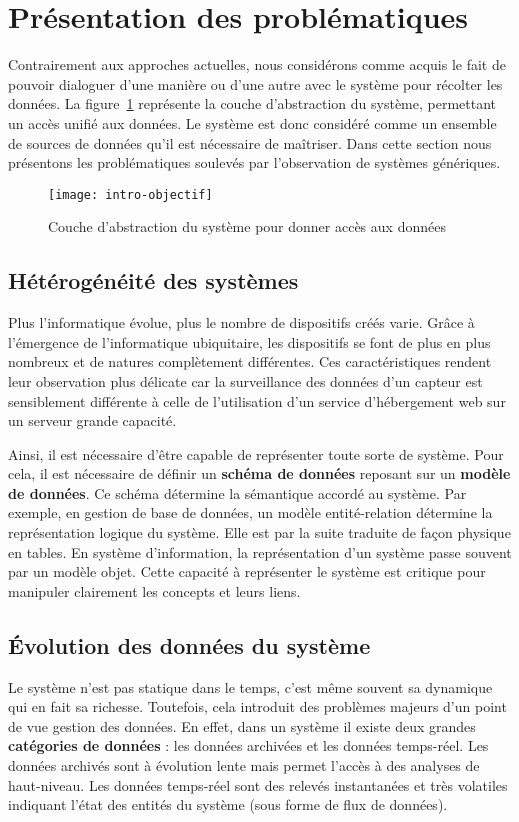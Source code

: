\section{Présentation des problématiques}\label{sec:intro:problematique}
Contrairement aux approches actuelles, nous considérons comme acquis le fait de pouvoir dialoguer d'une manière ou d'une autre avec le système pour récolter les données. La figure~\ref{fig:intro:objectif:abstraction} représente la couche d'abstraction du système, permettant un accès unifié aux données. Le système est donc considéré comme un ensemble de sources de données qu'il est nécessaire de maîtriser. Dans cette section nous présentons les problématiques soulevés par l'observation de systèmes génériques.

\begin{figure}[ht]
\centering
\texttt{[image: intro-objectif]}
\caption{Couche d'abstraction du système pour donner accès aux données}\label{fig:intro:objectif:abstraction}
\end{figure}

\subsection{Hétérogénéité des systèmes}
Plus l'informatique évolue, plus le nombre de dispositifs créés varie. Grâce à l'émergence de l'informatique ubiquitaire, les dispositifs se font de plus en plus nombreux et de natures complètement différentes. Ces caractéristiques rendent leur observation plus délicate car la surveillance des données d'un capteur est sensiblement différente à celle de l'utilisation d'un service d'hébergement web sur un serveur grande capacité.

Ainsi, il est nécessaire d'être capable de représenter toute sorte de système. Pour cela, il est nécessaire de définir un \textbf{schéma de données} reposant sur un \textbf{modèle de données}. Ce schéma détermine la sémantique accordé au système. Par exemple, en gestion de base de données, un modèle entité-relation détermine la représentation logique du système. Elle est par la suite traduite de façon physique en tables. En système d'information, la représentation d'un système passe souvent par un modèle objet. Cette capacité à représenter le système est critique pour manipuler clairement les concepts et leurs liens.

\subsection{Évolution des données du système}
Le système n'est pas statique dans le temps, c'est même souvent sa dynamique qui en fait sa richesse. Toutefois, cela introduit des problèmes majeurs d'un point de vue gestion des données. En effet, dans un système il existe deux grandes \textbf{catégories de données} : les données archivées et les données temps-réel. Les données archivés sont à évolution lente mais permet l'accès à des analyses de haut-niveau. Les données temps-réel sont des relevés instantanées et très volatiles indiquant l'état des entités du système (sous forme de flux de données).

